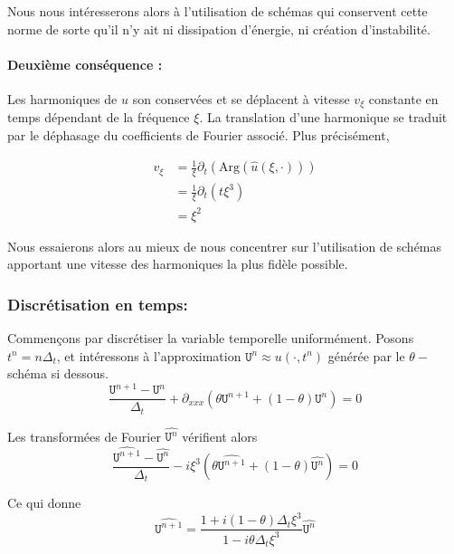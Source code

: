 \documentclass[12pt,a4paper]{article}
\numberwithin{equation}{section}
\begin{document}
Nous nous intéresserons alors à l'utilisation de schémas qui conservent cette norme de sorte qu'il n'y ait ni dissipation d'énergie, ni création d'instabilité.

\paragraph{Deuxième conséquence :} Les harmoniques de $u$ son conservées et se déplacent à vitesse $v_\xi$ constante en temps dépendant de la fréquence $\xi$. La translation d'une harmonique se traduit par le déphasage du coefficients de Fourier associé. Plus précisément, 

\begin{equation}
\begin{split}
    v_\xi &= \frac{1}{\xi}\partial_t (\text{Arg}(\hat{u}(\xi,\cdot)))
    \\ &= \frac{1}{\xi}\partial_t (t\xi^3) 
    \\ &= \xi^2
\end{split}
\end{equation}

Nous essaierons alors au mieux de nous concentrer sur l'utilisation de schémas apportant une vitesse des harmoniques la plus fidèle possible.

\subsubsection{ Discrétisation en temps: }
Commençons par discrétiser la variable temporelle uniformément. Posons $t^n = n\Delta_t$, et intéressons à l'approximation $\texttt{U}^n \approx u(\cdot,t^n)$ générée par le $\theta-$schéma si dessous.
\begin{equation}
\frac{\texttt{U}^{n+1}-\texttt{U}^n}{\Delta_t} + \partial_{xxx}(\theta\texttt{U}^{n+1} + (1-\theta)\texttt{U}^{n}) = 0 
\end{equation}

Les transformées de Fourier $\widehat{\texttt{U}^n}$ vérifient alors
\begin{equation*}
\frac{\widehat{\texttt{U}^{n+1}}-\widehat{\texttt{U}^n}}{\Delta_t} - i \xi^3(\theta\widehat{\texttt{U}^{n+1}} + (1-\theta)\widehat{\texttt{U}^{n}}) = 0 
\end{equation*}

Ce qui donne 
\begin{equation*}
\widehat{\texttt{U}^{n+1}} = \frac{1 + i (1-\theta)\Delta_t\xi^3}{1 - i\theta \Delta_t\xi^3 }\widehat{\texttt{U}^{n}}  
\end{equation*}
\end{document}
